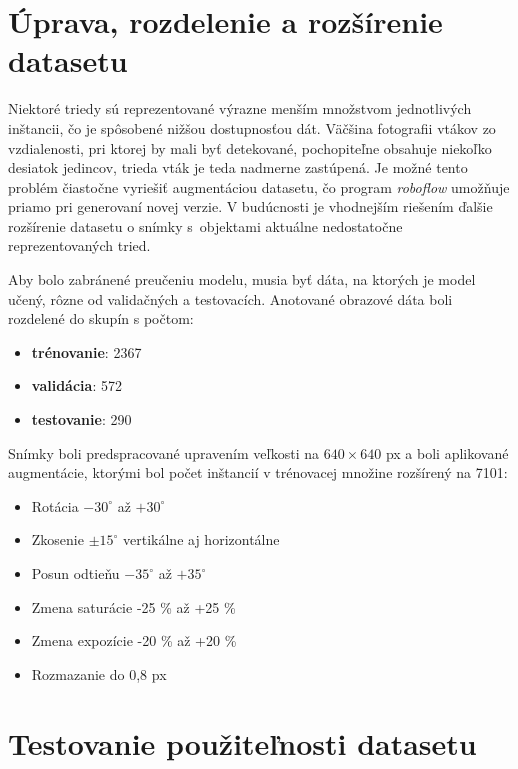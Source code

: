     \section{Úprava, rozdelenie a rozšírenie datasetu}

        Niektoré triedy sú reprezentované výrazne menším množstvom jednotlivých inštancii, čo je spôsobené nižšou dostupnosťou dát. Väčšina fotografii vtákov zo vzdialenosti, pri ktorej by mali byť detekované, pochopiteľne obsahuje niekoľko desiatok jedincov, trieda vták je teda nadmerne zastúpená. Je možné tento problém čiastočne vyriešiť augmentáciou datasetu, čo program \emph{roboflow} umožňuje priamo pri generovaní novej verzie. V budúcnosti je vhodnejším riešením ďalšie rozšírenie datasetu o snímky s~objektami aktuálne nedostatočne reprezentovaných tried.

        Aby bolo zabránené preučeniu modelu, musia byť dáta, na ktorých je model učený, rôzne od validačných a testovacích. Anotované obrazové dáta boli rozdelené do skupín s počtom:

        \begin{itemize}
            \item \textbf{trénovanie}: 2367
            \item \textbf{validácia}: 572
            \item \textbf{testovanie}: 290
        \end{itemize}

        Snímky boli predspracované upravením veľkosti na \(640 \times 640\) px a boli aplikované augmentácie, ktorými bol počet inštancií v trénovacej množine rozšírený na 7101:

        \begin{itemize}
            \item Rotácia \(-30^\circ\) až \(+30^\circ\)
            \item Zkosenie \(\pm 15^\circ\) vertikálne aj horizontálne
            \item Posun odtieňu \(-35^\circ\) až \(+35^\circ\)
            \item Zmena saturácie -25 \% až +25 \%
            \item Zmena expozície -20 \% až +20 \%
            \item Rozmazanie do 0,8 px
        \end{itemize}

    \section{Testovanie použiteľnosti datasetu}

